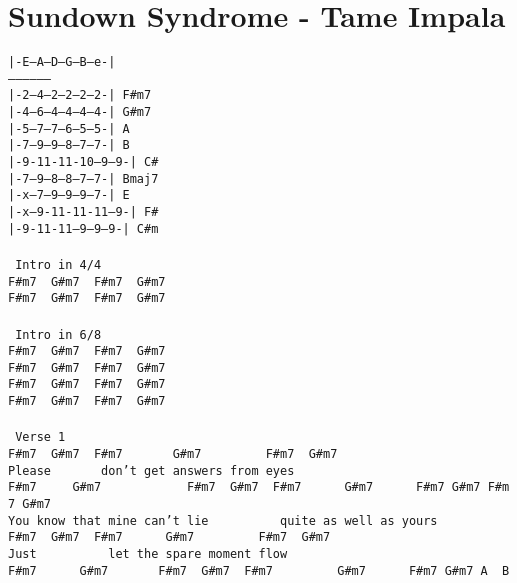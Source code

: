 \newpage
\section{Sundown Syndrome - Tame Impala}
\label{Sundown Syndrome - Tame Impala}
\texttt{|-E--A--D--G--B--e-|\\
------------------\\
|-2--4--2--2--2--2-|\ F#m7\\
|-4--6--4--4--4--4-|\ G#m7\\
|-5--7--7--6--5--5-|\ A\\
|-7--9--9--8--7--7-|\ B\\
|-9-11-11-10--9--9-|\ C\#\\
|-7--9--8--8--7--7-|\ Bmaj7\\
|-x--7--9--9--9--7-|\ E\\
|-x--9-11-11-11--9-|\ F\#\\
|-9-11-11--9--9--9-|\ C\#m\\
\\
\lbrack\ Intro\ in\ 4/4\rbrack\\
F\#m7\ \ G\#m7\ \ F\#m7\ \ G\#m7\\
F\#m7\ \ G\#m7\ \ F\#m7\ \ G\#m7\\
\\
\lbrack\ Intro\ in\ 6/8\rbrack\\
F\#m7\ \ G\#m7\ \ F\#m7\ \ G\#m7\\
F\#m7\ \ G\#m7\ \ F\#m7\ \ G\#m7\\
F\#m7\ \ G\#m7\ \ F\#m7\ \ G\#m7\\
F\#m7\ \ G\#m7\ \ F\#m7\ \ G\#m7\\
\\
\lbrack\ Verse\ 1\rbrack\\
F\#m7\ \ G\#m7\ \ F\#m7\ \ \ \ \ \ \ G\#m7\ \ \ \ \ \ \ \ \ F\#m7\ \ G\#m7\\
Please\ \ \ \ \ \ \ don't\ get\ answers\ from\ eyes\\
F\#m7\ \ \ \ \ G\#m7\ \ \ \ \ \ \ \ \ \ \ \ F\#m7\ \ G\#m7\ \ F\#m7\ \ \ \ \ \ G\#m7\ \ \ \ \ \ F\#m7\ G\#m7\ F\#m7\ G\#m7\\
You\ know\ that\ mine\ can't\ lie\ \ \ \ \ \ \ \ \ \ quite\ as\ well\ as\ yours\\
F\#m7\ \ G\#m7\ \ F\#m7\ \ \ \ \ \ G\#m7\ \ \ \ \ \ \ \ \ F\#m7\ \ G\#m7\\
Just\ \ \ \ \ \ \ \ \ \ let\ the\ spare\ moment\ flow\\
F\#m7\ \ \ \ \ \ G\#m7\ \ \ \ \ \ \ F\#m7\ \ G\#m7\ \ F\#m7\ \ \ \ \ \ \ \ \ G\#m7\ \ \ \ \ \ F\#m7\ G\#m7\ A\ \ B\\
}
